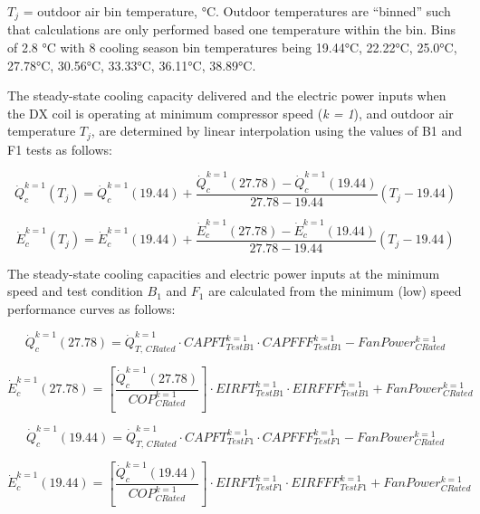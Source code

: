 \(T_{j}\) = outdoor air bin temperature, °C. Outdoor temperatures are ``binned'' such that calculations are only performed based one temperature within the bin. Bins of 2.8 °C with 8 cooling season bin temperatures being 19.44°C, 22.22°C, 25.0°C, 27.78°C, 30.56°C, 33.33°C, 36.11°C, 38.89°C.

The steady-state cooling capacity delivered and the electric power inputs when the DX coil is operating at minimum compressor speed (\emph{k = 1}), and outdoor air temperature \(T_{j}\), are determined by linear interpolation using the values of B1 and F1 tests as follows:

\begin{equation}
\dot Q_c^{k = 1}({T_j}) = \dot Q_c^{k = 1}(19.44) + \frac{{\dot Q_c^{k = 1}(27.78) - \dot Q_c^{k = 1}(19.44)}}{{27.78 - 19.44}}\left( {{T_j} - 19.44} \right)
\end{equation}

\begin{equation}
\dot E_c^{k = 1}({T_j}) = \dot E_c^{k = 1}(19.44) + \frac{{\dot E_c^{k = 1}(27.78) - \dot E_c^{k = 1}(19.44)}}{{27.78 - 19.44}}\left( {{T_j} - 19.44} \right)
\end{equation}

The steady-state cooling capacities and electric power inputs at the minimum speed and test condition \(B_{1}\) and \(F_{1}\) are calculated from the minimum (low) speed performance curves as follows:

\begin{equation}
\dot Q_c^{k = 1}(27.78) = \dot Q_{T,\,CRated}^{k = 1} \cdot CAPFT_{TestB1}^{k = 1} \cdot CAPFFF_{TestB1}^{k = 1} - FanPower_{CRated}^{k = 1}
\end{equation}

\begin{equation}
\dot E_c^{k = 1}(27.78) = \left[ {\frac{{\dot Q_c^{k = 1}(27.78)}}{{COP_{CRated}^{k = 1}}}} \right] \cdot EIRFT_{TestB1}^{k = 1} \cdot EIRFFF_{TestB1}^{k = 1} + FanPower_{CRated}^{k = 1}
\end{equation}

\begin{equation}
\dot Q_c^{k = 1}(19.44) = \dot Q_{T,\,CRated}^{k = 1} \cdot CAPFT_{TestF1}^{k = 1} \cdot CAPFFF_{TestF1}^{k = 1} - FanPower_{CRated}^{k = 1}
\end{equation}

\begin{equation}
\dot E_c^{k = 1}(19.44) = \left[ {\frac{{\dot Q_c^{k = 1}(19.44)}}{{COP_{CRated}^{k = 1}}}} \right] \cdot EIRFT_{TestF1}^{k = 1} \cdot EIRFFF_{TestF1}^{k = 1} + FanPower_{CRated}^{k = 1}
\end{equation}

